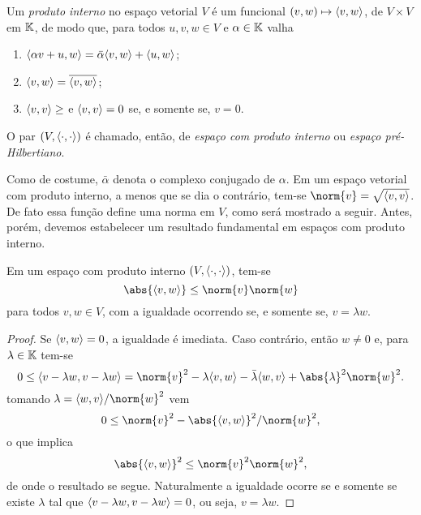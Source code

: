 \begin{defn}
    Um \emph{produto interno} no espaço vetorial \( V \) é um funcional \( (v, w) \mapsto \langle v,w\rangle \), de \( V \times V \) em \( \mathbb{K} \), de modo que, para todos \( u, v, w \in V \) e \( \alpha \in \mathbb{K} \) valha
    \begin{enumerate}[label=\roman*)]
        \item \( \langle\alpha v + u, w\rangle = \bar{\alpha} \langle v, w\rangle + \langle u, w\rangle \);
        \item \( \langle v, w\rangle = \overline{\langle v,w\rangle} \);
        \item \( \langle v, v\rangle \geq \) e \( \langle v, v\rangle = 0 \) se, e somente se, \( v = 0 \).
    \end{enumerate}
    O par \( (V, \langle\cdot,\cdot\rangle) \) é chamado, então, de \emph{espaço com produto interno} ou \emph{espaço pré-Hilbertiano}.
\end{defn}
Como de costume, \( \bar{\alpha} \) denota o complexo conjugado de \( \alpha \).
Em um espaço vetorial com produto interno, a menos que se dia o contrário, tem-se \( \norm{ v } = \sqrt{ \dotprod{v,v} } \).
De fato essa função define uma norma em \( V \), como será mostrado a seguir.
Antes, porém, devemos estabelecer um resultado fundamental em espaços com produto interno.
\begin{teo}
    Em um espaço com produto interno \( (V, \langle\cdot,\cdot\rangle) \), tem-se
    \begin{equation}
        \abs{ \dotprod{v, w} } \leq \norm{ v } \norm{ w }
    \end{equation}
    para todos \( v, w \in V \), com a igualdade ocorrendo se, e somente se, \( v = \lambda w \).
\end{teo}
\begin{proof}
    Se \( \langle v, w\rangle = 0 \), a igualdade é imediata.
    Caso contrário, então \( w \neq 0 \) e, para \( \lambda \in \mathbb{K} \) tem-se
    \begin{equation}
        0 \leq \dotprod{v - \lambda w, v - \lambda w} = \norm{ v }^2 -\lambda \dotprod{v, w} -\bar{\lambda} \dotprod{w, v} + \abs{ \lambda }^2 \norm{ w }^2
    .\end{equation}
    tomando \( \lambda = \dotprod{w, v}/\norm{ w }^2 \) vem
    \begin{equation}
        0 \leq \norm{ v }^2 - \abs{ \dotprod{v, w} }^2/ \norm{ w }^2
    ,\end{equation}
    o que implica
    \begin{equation}
        \abs{ \dotprod{v, w} }^2 \leq \norm{ v }^2 \norm{ w }^2
    ,\end{equation}
    de onde o resultado se segue.
    Naturalmente a igualdade ocorre se e somente se existe \( \lambda \) tal que \( \langle v - \lambda w, v - \lambda w\rangle = 0 \), ou seja, \( v = \lambda w \).
\end{proof}

